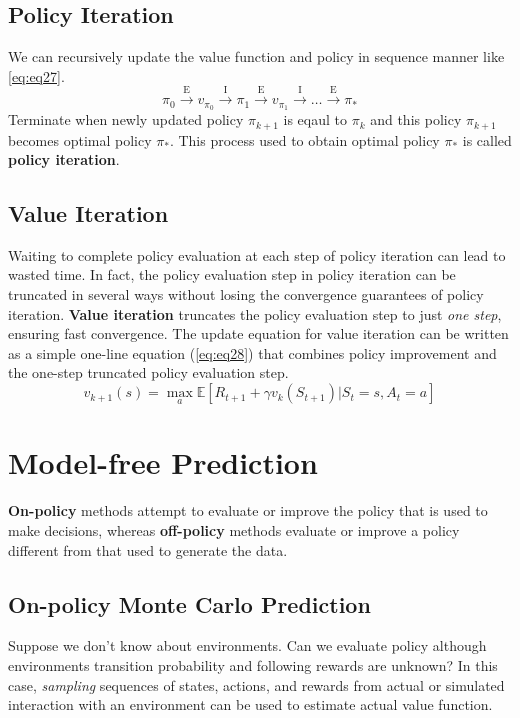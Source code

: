 \documentclass[
	10pt, %
]{article}
\theoremstyle{plain}
\newcommand{\mrm}[1]{\mathrm{#1}}
\newcommand{\mbb}[1]{\mathbb{#1}}
\newcommand{\tb}[1]{\textbf{#1}}
\newcommand{\ti}[1]{\textit{#1}}
\numberwithin{equation}{subsection} %
\begin{document}
\subsection{Policy Iteration}
We can recursively update the value function and policy in sequence manner like \cref{eq:eq27}.
\begin{equation} \label{eq:eq27}
    \pi_0 \xrightarrow{\mrm{E}} v_{\pi_0} \xrightarrow{\mrm{I}} \pi_1 \xrightarrow{\mrm{E}} v_{\pi_1} \xrightarrow{\mrm{I}} \dots \xrightarrow{\mrm{E}} \pi_*
\end{equation}
Terminate when newly updated policy $\pi_{k+1}$ is eqaul to $\pi_k$ and this policy $\pi_{k+1}$ becomes optimal policy $\pi_*$. This process used to obtain optimal policy $\pi_*$ is called \tb{policy iteration}.

\subsection{Value Iteration}
Waiting to complete policy evaluation at each step of policy iteration can lead to wasted time. In fact, the policy evaluation step in policy iteration can be truncated in several ways without losing the convergence guarantees of policy iteration. \tb{Value iteration} truncates the policy evaluation step to just \ti{one step}, ensuring fast convergence. The update equation for value iteration can be written as a simple one-line equation (\cref{eq:eq28}) that combines policy improvement and the one-step truncated policy evaluation step.
\begin{equation} \label{eq:eq28}
    v_{k+1}(s) = \max_a \mbb{E} [R_{t+1} + \gamma v_k(S_{t+1}) | S_t=s, A_t=a]
\end{equation}
\newpage



\section{Model-free Prediction}
\tb{On-policy} methods attempt to evaluate or improve the policy that is used to make decisions, whereas \tb{off-policy} methods evaluate or improve a policy different from that used to generate the data.
\subsection{On-policy Monte Carlo Prediction}
Suppose we don't know about environments. Can we evaluate policy although environments transition probability and following rewards are unknown? In this case, \ti{sampling} sequences of states, actions, and rewards from actual or simulated interaction with an environment can be used to estimate actual value function.
\end{document}
